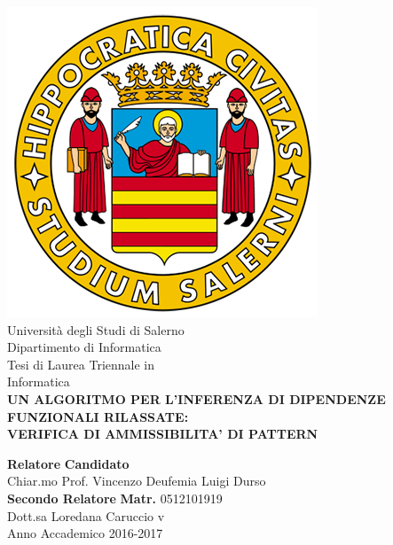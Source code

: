 \begin{center}
    \includegraphics[scale = 0.3]{Immagini/logoUnisa.png}\\
    \vspace{1cm}
    {\Large Università degli Studi di Salerno}\\[0.2truecm]
    {\large Dipartimento di Informatica}\\
    \hrulefill
    \vfill
    {\large Tesi di Laurea Triennale in }\\[0.2truecm]
    {\Large Informatica}\\
    \vfill
    {\large \bf UN ALGORITMO PER L'INFERENZA DI DIPENDENZE FUNZIONALI RILASSATE:}\\
    {\large \bf VERIFICA DI AMMISSIBILITA' DI PATTERN}
    \vfill\vfill\vfill
    
    
    {\bf Relatore} \hfill {\bf Candidato} \\
    Chiar.mo Prof. Vincenzo Deufemia \hfill Luigi Durso \\
    {\bf Secondo Relatore}
    \hfill \textbf{Matr.} 0512101919\\
    
    
    Dott.sa Loredana Caruccio  \hfill {\phantom v} \\
    \vspace{1cm}
    \hrulefill 
    \vfill
    Anno Accademico 2016-2017
\end{center}